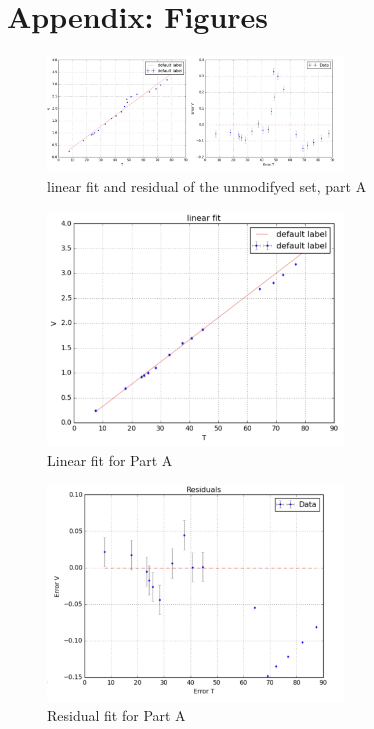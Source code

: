 \documentclass[12pt,a4paper]{report}
\begin{document}
\section{Appendix: Figures}

\begin{figure}[H]
    \centering
    \includegraphics[width=0.7\textwidth]{Part A results/full set linear fit.png}
    \caption{linear fit  and residual of the unmodifyed set, part A}
    \label{fig:appendix_partA_full_set_fit}
\end{figure}


\begin{figure}[H]
    \centering
    \includegraphics[width=0.7\textwidth]{Part A results/linear fit.png}
    \caption{Linear fit for Part A}
    \label{fig:appendix_partA_linear_fit}
\end{figure}

\begin{figure}[H]
    \centering
    \includegraphics[width=0.7\textwidth]{Part A results/res.png}
    \caption{Residual fit for Part A}
    \label{fig:appendix_partA_residual_fit}
\end{figure}
\end{document}
